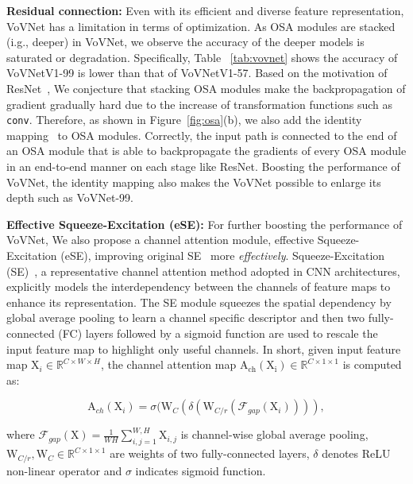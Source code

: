 \documentclass[10pt,twocolumn,letterpaper]{article}
\begin{document}
\noindent
\textbf{Residual connection:} Even with its efficient and diverse feature representation, VoVNet has a limitation in terms of optimization.  
As OSA modules are stacked (i.g., deeper) in VoVNet, we observe the accuracy of the deeper models is saturated or degradation.
Specifically, Table ~\ref{tab:vovnet} shows the accuracy of VoVNetV1-99 is lower than that of VoVNetV1-57.
Based on the motivation of ResNet~\cite{he2016deep}, We conjecture that stacking OSA modules make the backpropagation of gradient gradually hard due to the increase of transformation functions such as \texttt{conv}.
Therefore, as shown in Figure~\ref{fig:osa}(b), we also add the identity mapping~\cite{he2016deep} to OSA modules.
Correctly, the input path is connected to the end of an OSA module that is able to backpropagate the gradients of every OSA module in an end-to-end manner on each stage like ResNet.
Boosting the performance of VoVNet, the identity mapping also makes the VoVNet possible to enlarge its depth such as VoVNet-99.



\noindent
\textbf{Effective Squeeze-Excitation (eSE):}
For further boosting the performance of VoVNet, We also propose a channel attention module, effective Squeeze-Excitation (eSE), improving original SE~\cite{hu2018squeeze} more \textit{effectively}.
Squeeze-Excitation (SE)~\cite{hu2018squeeze}, a representative channel attention method adopted in CNN architectures, explicitly models the interdependency between the channels of feature maps to enhance its representation.
The SE module squeezes the spatial dependency by global average pooling to learn a channel specific descriptor and then two fully-connected (FC) layers followed by a sigmoid function are used to rescale the input feature map to highlight only useful channels. In short, given input feature map $\mathrm{X}_i \in \mathbb{R}^{C \times W \times H}$, the channel attention map $\mathrm{A_{ch}}(\mathrm{X_i}) \in \mathbb{R}^{C \times 1 \times 1}$ is computed as:

\begin{equation} \label{eq:5}
\mathrm{A}_{ch}(\mathrm{X}_i) = \sigma(\mathrm{W}_{C}(\delta(\mathrm{W}_{C/r}(\mathcal{F}_{gap}(\mathrm{X}_i)))),
\end{equation}

\noindent
where $\mathcal{F}_{gap}(\mathrm{X}) = \frac{1}{WH}\sum_{i,j=1}^{W,H}\mathrm{X}_{i,j}$ is channel-wise global average pooling, $\mathrm{W}_{C/r}, \mathrm{W}_{C} \in \mathbb{R}^{C \times 1 \times 1}$ are weights of two fully-connected layers, $\delta$ denotes ReLU non-linear operator and $\sigma$ indicates sigmoid function.
\end{document}
